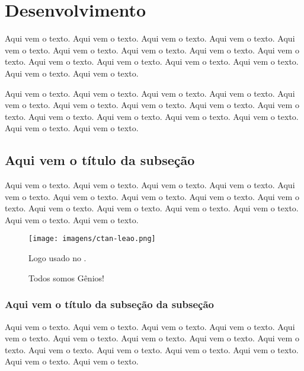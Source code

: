 \documentclass[a4paper, 12pt]{article}
\begin{document}
\section{Desenvolvimento}

Aqui vem o texto. Aqui vem o texto. Aqui vem o texto. Aqui vem o texto. Aqui vem o texto. Aqui vem o texto. Aqui vem o texto. Aqui vem o texto. Aqui vem o texto. Aqui vem o texto. Aqui vem o texto. Aqui vem o texto. Aqui vem o texto. Aqui vem o texto. Aqui vem o texto.

Aqui vem o texto. Aqui vem o texto. Aqui vem o texto. Aqui vem o texto. Aqui vem o texto. Aqui vem o texto. Aqui vem o texto. Aqui vem o texto. Aqui vem o texto. Aqui vem o texto. Aqui vem o texto. Aqui vem o texto. Aqui vem o texto. Aqui vem o texto. Aqui vem o texto.

\subsection{Aqui vem o título da subseção}

Aqui vem o texto. Aqui vem o texto. Aqui vem o texto. Aqui vem o texto. Aqui vem o texto. Aqui vem o texto. Aqui vem o texto. Aqui vem o texto. Aqui vem o texto. Aqui vem o texto. Aqui vem o texto. Aqui vem o texto. Aqui vem o texto. Aqui vem o texto. Aqui vem o texto.

\begin{figure}[htb]
\cetering
\texttt{[image: imagens/ctan-leao.png]}
\caption{Logo usado no \LaTex.}
\caption{Todos somos Gênios!}
\label{figura-leao}
\end{figure}

\subsubsection{Aqui vem o título da subseção da subseção}

Aqui vem o texto. Aqui vem o texto. Aqui vem o texto. Aqui vem o texto. Aqui vem o texto. Aqui vem o texto. Aqui vem o texto. Aqui vem o texto. Aqui vem o texto. Aqui vem o texto. Aqui vem o texto. Aqui vem o texto. Aqui vem o texto. Aqui vem o texto. Aqui vem o texto.  

 

 
\end{document}
